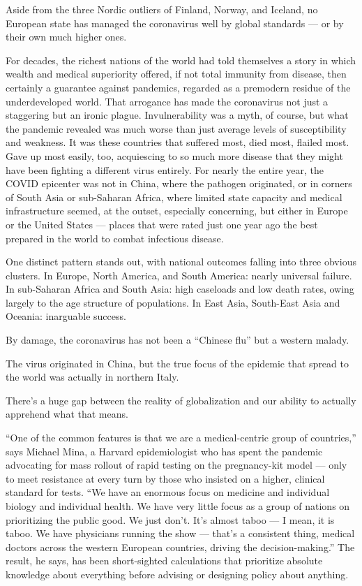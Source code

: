 \documentclass[
]{book}
\begin{document}
Aside from the three Nordic outliers of Finland, Norway, and Iceland, no European state has managed the coronavirus well by global standards --- or by their own much higher ones.

For decades, the richest nations of the world had told themselves a story in which wealth and medical superiority offered, if not total immunity from disease, then certainly a guarantee against pandemics, regarded as a premodern residue of the underdeveloped world. That arrogance has made the coronavirus not just a staggering but an ironic plague. Invulnerability was a myth, of course, but what the pandemic revealed was much worse than just average levels of susceptibility and weakness. It was these countries that suffered most, died most, flailed most. Gave up most easily, too, acquiescing to so much more disease that they might have been fighting a different virus entirely. For nearly the entire year, the COVID epicenter was not in China, where the pathogen originated, or in corners of South Asia or sub-Saharan Africa, where limited state capacity and medical infrastructure seemed, at the outset, especially concerning, but either in Europe or the United States --- places that were rated just one year ago the best prepared in the world to combat infectious disease.

One distinct pattern stands out, with national outcomes falling into three obvious clusters.
In Europe, North America, and South America: nearly universal failure.
In sub-Saharan Africa and South Asia: high caseloads and low death rates,
owing largely to the age structure of populations.
In East Asia, South-East Asia and Oceania: inarguable success.

By damage, the coronavirus has not been a ``Chinese flu'' but a western malady.

The virus originated in China, but the true focus of the epidemic that spread to the world
was actually in northern Italy.

There's a huge gap between the reality of globalization and our ability to actually apprehend what that means.

``One of the common features is that we are a medical-centric group of countries,'' says Michael Mina, a Harvard epidemiologist who has spent the pandemic advocating for mass rollout of rapid testing on the pregnancy-kit model --- only to meet resistance at every turn by those who insisted on a higher, clinical standard for tests. ``We have an enormous focus on medicine and individual biology and individual health. We have very little focus as a group of nations on prioritizing the public good. We just don't. It's almost taboo --- I mean, it is taboo. We have physicians running the show --- that's a consistent thing, medical doctors across the western European countries, driving the decision-making.'' The result, he says, has been short-sighted calculations that prioritize absolute knowledge about everything before advising or designing policy about anything.
\end{document}
